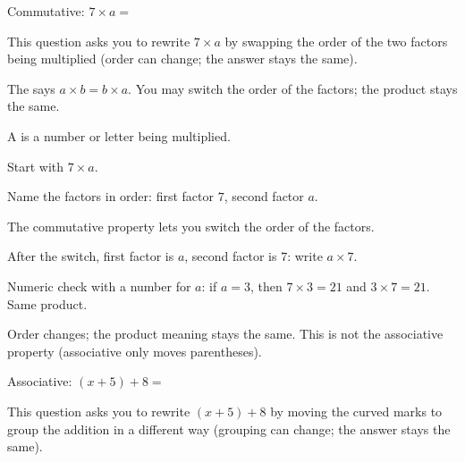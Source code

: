 
\noindent Commutative: $7 \times a = $\ansblank


\noindent This question asks you to rewrite $7 \times a$ by swapping the order of
the two factors being multiplied (order can change; the answer stays the same).

\begin{words}
  \item The says
        $a \times b = b \times a$. You may switch the order of the factors; the
        product stays the same.
  \item A is a number or letter being multiplied.
\end{words}

\begin{steps}
  \item Start with $7 \times a$.
  \item Name the factors in order: first factor $7$, second factor $a$.
  \item The commutative property lets you switch the order of the factors.
  \item After the switch, first factor is $a$, second factor is $7$: write
        $a \times 7$.
  \item Numeric check with a number for $a$: if $a = 3$, then $7 \times 3 = 21$
        and $3 \times 7 = 21$. Same product.
\end{steps}


\noindent Order changes; the product meaning stays the same. This is not the
associative property (associative only moves parentheses).


\noindent Associative: $(x + 5) + 8 = $\ansblank


\noindent This question asks you to rewrite $(x + 5) + 8$ by moving the curved
marks to group the addition in a different way (grouping can change; the answer
stays the same).

